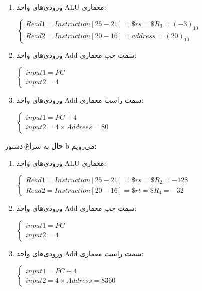 \begin{enumerate}
	\item ورودی‌های واحد ALU معماری:
	
	\setLTR
	$
	\begin{cases}
		Read1= Instruction[25-21] =\$rs = \$R_3 = (-3)_{10} \\
		Read2 =Instruction[20-16]= address = (20)_{10}
		
		\end{cases}
	$
	\setRTL
	
	\item ورودی‌های واحد Add سمت چپ معماری:
	
	\setLTR
	$
	\begin{cases}
		input1= PC  \\
		input2 = 4
		
	\end{cases}
	$
	
	\setRTL
	
	\item ورودی‌های واحد Add سمت راست معماری:
	
	\setLTR
	
		$
	\begin{cases}
		input1= PC + 4 \\
		input2 = 4 \times Address = 80
		
	\end{cases}
	$
		\setRTL
		
		
\end{enumerate}

حال به سراغ دستور b می‌رویم:


\begin{enumerate}
	\item ورودی‌های واحد ALU معماری:
	
\setLTR
$
\begin{cases}
	Read1= Instruction[25-21] =\$rs = \$R_2 = -128 \\
	Read2 =Instruction[20-16]= \$rt =\$R_4 = -32
	
\end{cases}
$
\setRTL

	\item ورودی‌های واحد Add سمت چپ معماری:
	
		\setLTR
	$
	\begin{cases}
		input1= PC  \\
		input2 = 4
		
	\end{cases}
	$
	
	\setRTL
	
	\item ورودی‌های واحد Add سمت راست معماری:
	
	\setLTR
	$
	\begin{cases}
		input1= PC + 4  \\
		input2 = 4 \times Address = 8360
		
	\end{cases}
	$
	
	\setRTL
	
\end{enumerate}
\pagebreak
